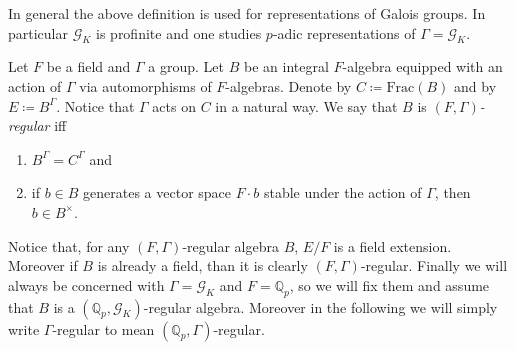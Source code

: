 \begin{rem}[]
	In general the above definition is used for representations of Galois groups.
	In particular $\mathscr{G}_K$ is profinite and one studies
	$p$-adic representations of $\Gamma = \mathscr{G}_K$.
\end{rem}




\begin{defn}
	Let $F$ be a field and $\Gamma$ a group.
	Let $B$ be an integral $F$-algebra
	equipped with an action of $\Gamma$ via automorphisms of $F$-algebras.
	Denote by $C \coloneqq \mathrm{Frac}(B)$ and by $E \coloneqq B^{\Gamma}$.
	Notice that $\Gamma$ acts on $C$ in a natural way.
	We say that $B$ is \emph{$(F,\Gamma)$-regular} iff
\begin{enumerate}
	\item $B^{\Gamma} = C^{\Gamma}$ and
	\item if $b \in B$ generates a vector space $F \cdot b$
		stable under the action of $\Gamma$, then $b \in B^{\times}$.
\end{enumerate}
\end{defn}


\begin{rem}[]
	Notice that, for any $(F,\Gamma)$-regular algebra \(B\), $E/F$ is a field extension.
	Moreover if $B$ is already a field, than it is clearly $(F,\Gamma)$-regular.
	Finally we will always be concerned with $\Gamma = \mathscr{G}_K$ and $F = \mathbb{Q}_p$,
	so we will fix them and assume that $B$ is a $(\mathbb{Q}_p, \mathscr{G}_K)$-regular
	algebra.
	Moreover in the following we will simply write 
	$\Gamma$-regular to mean $(\mathbb{Q}_p, \Gamma)$-regular.
\end{rem}


